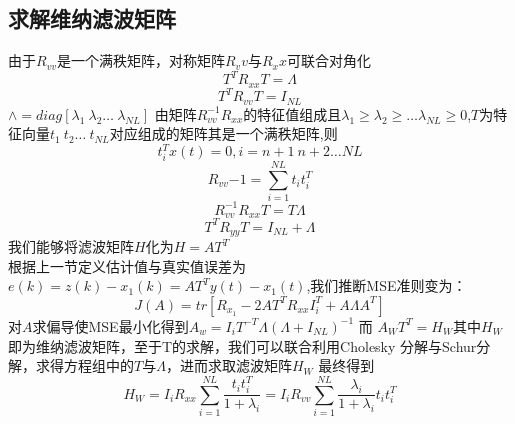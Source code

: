 \subsection{求解维纳滤波矩阵} 
由于$R_{vv}$是一个满秩矩阵，对称矩阵$R_vv$与$R_xx$可联合对角化
\begin{equation}
	T^TR_{xx}T=\Lambda \label{5}
\end{equation}
\begin{equation}
	T^TR_{vv}T=I_{NL} \label{6}
\end{equation}
$\wedge=diag[\lambda_1 \ \lambda_2\ldots\ \lambda_	{NL}]$
由矩阵$R_{vv}^{-1}R_{xx} $的特征值组成且$\lambda_1\ge \lambda_2\ge \ldots \lambda_{NL} \ge 0$,$T$为特征向量$t_1\ t_2\ldots \ t_{NL}$对应组成的矩阵其是一个满秩矩阵,则
\begin{equation}
	t_i^Tx(t)=0,i=n+1\ n+2\ldots NL
\end{equation}
\begin{equation}
	R_{vv}{-1}=\sum\limits_{i=1}^{NL}{{t_it_i^T}}
\end{equation}
\begin{equation}
	R_{vv}^{-1}R_{xx}T=T\Lambda
\end{equation}
\begin{equation}
	T^TR_{yy}T=I_{NL}+\Lambda \label{7}
\end{equation}
我们能够将滤波矩阵$H$化为$H=AT^T$\\
根据上一节定义估计值与真实值误差为$e(k)=z(k)-x_1(k)=AT^Ty(t)-x_1(t)$,我们推断MSE准则变为：
\begin{equation}
	J(A)=tr[R_{x_1}-2AT^TR_{xx}I^T_i+A\Lambda A^T] 
\end{equation}
对$A$求偏导使MSE最小化得到$A_w=I_iT^{-T}\Lambda(\Lambda+I_{NL})^{-1}$
而 $A_WT^T=H_W$其中$H_W$即为维纳滤波矩阵，至于T的求解，我们可以联合利用Cholesky\cite{ref9} 分解与Schur\cite{ref10}分解，求得方程组中的$T$与$\Lambda$，进而求取滤波矩阵$H_W$
最终得到
\begin{equation}
	H_W=I_iR_{xx}\sum\limits_{i=1}^{NL}{\frac{t_it_i^T}{1+\lambda_i}}=
	I_iR_{vv}\sum\limits_{i=1}^{NL}{\frac{\lambda_i}{1+\lambda_i}t_it_i^T}
\end{equation}
